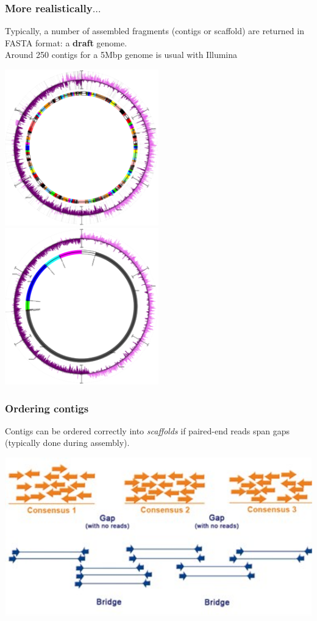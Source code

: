 \begin{frame}
  \frametitle{More realistically$\ldots$}
  Typically, a number of assembled fragments (contigs or scaffold) are returned in FASTA format: a \textbf{draft} genome.\\
  Around 250 contigs for a 5Mbp genome is usual with Illumina\\
  \begin{center}
    \includegraphics[width=0.5\textwidth]{images/circle_1}
    \includegraphics[width=0.5\textwidth]{images/circle_3}
  \end{center}    
\end{frame}

\begin{frame}
  \frametitle{Ordering contigs}
  Contigs can be ordered correctly into \textit{scaffolds} if paired-end reads span gaps (typically done during assembly).
  \begin{center}
    \includegraphics[width=1\textwidth]{images/contig_order_pe}
  \end{center}    
\end{frame}

